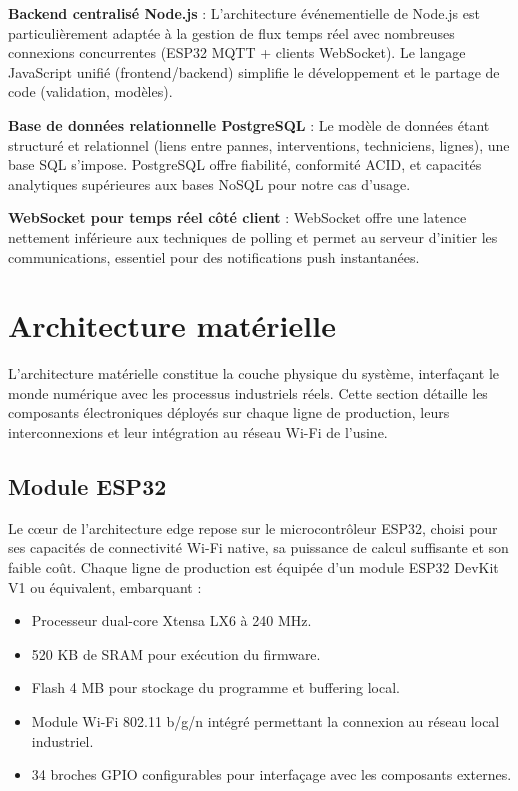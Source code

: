 \textbf{Backend centralisé Node.js} : L'architecture événementielle de Node.js est particulièrement adaptée à la gestion de flux temps réel avec nombreuses connexions concurrentes (ESP32 MQTT + clients WebSocket). Le langage JavaScript unifié (frontend/backend) simplifie le développement et le partage de code (validation, modèles).

\textbf{Base de données relationnelle PostgreSQL} : Le modèle de données étant structuré et relationnel (liens entre pannes, interventions, techniciens, lignes), une base SQL s'impose. PostgreSQL offre fiabilité, conformité ACID, et capacités analytiques supérieures aux bases NoSQL pour notre cas d'usage.

\textbf{WebSocket pour temps réel côté client} : WebSocket offre une latence nettement inférieure aux techniques de polling et permet au serveur d'initier les communications, essentiel pour des notifications push instantanées.


\section{Architecture matérielle}

L'architecture matérielle constitue la couche physique du système, interfaçant le monde numérique avec les processus industriels réels. Cette section détaille les composants électroniques déployés sur chaque ligne de production, leurs interconnexions et leur intégration au réseau Wi-Fi de l'usine.

\subsection{Module ESP32}

Le c\oe{}ur de l'architecture edge repose sur le microcontrôleur ESP32, choisi pour ses capacités de connectivité Wi-Fi native, sa puissance de calcul suffisante et son faible coût. Chaque ligne de production est équipée d'un module ESP32 DevKit V1 ou équivalent, embarquant :

\begin{itemize}
    \item Processeur dual-core Xtensa LX6 à 240 MHz.
    \item 520 KB de SRAM pour exécution du firmware.
    \item Flash 4 MB pour stockage du programme et buffering local.
    \item Module Wi-Fi 802.11 b/g/n intégré permettant la connexion au réseau local industriel.
    \item 34 broches GPIO configurables pour interfaçage avec les composants externes.
\end{itemize}

